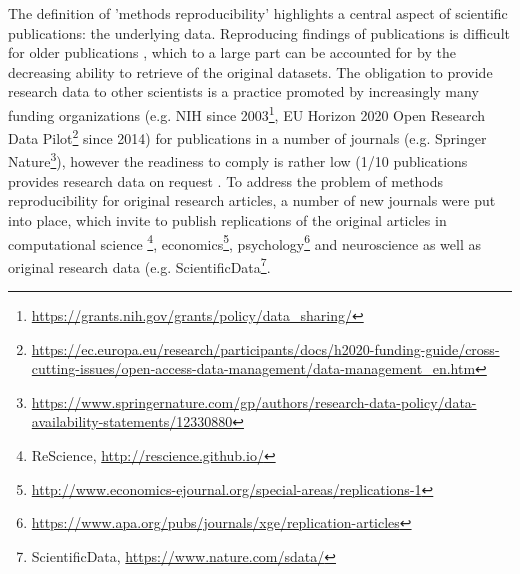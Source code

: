 The definition of 'methods reproducibility' highlights a central aspect of scientific publications: the underlying data. Reproducing findings of publications is difficult for older publications \citep{Vines_2013,Rostami_2017}, which to a large part can be accounted for by the decreasing ability to retrieve of the original datasets. The obligation to provide research data to other scientists is a practice promoted by increasingly many funding organizations (e.g. NIH since 2003\footnote{\url{https://grants.nih.gov/grants/policy/data_sharing/}}, EU Horizon 2020 Open Research Data Pilot\footnote{\url{https://ec.europa.eu/research/participants/docs/h2020-funding-guide/cross-cutting-issues/open-access-data-management/data-management_en.htm}} since 2014) for publications in a number of journals (e.g. Springer Nature\footnote{\url{https://www.springernature.com/gp/authors/research-data-policy/data-availability-statements/12330880}}), however the readiness to comply is rather low (1/10 publications provides research data on request \citep{Savage_2009}. To address the problem of methods reproducibility for original research articles, a number of new journals were put into place, which invite to publish replications of the original articles in computational science \footnote{ReScience, \url{http://rescience.github.io/}}, economics\footnote{\url{http://www.economics-ejournal.org/special-areas/replications-1}}, psychology\footnote{\url{https://www.apa.org/pubs/journals/xge/replication-articles}} and neuroscience \citep{Yeung_2017} as well as original research data (e.g. ScientificData\footnote{ScientificData, \url{https://www.nature.com/sdata/}}.

